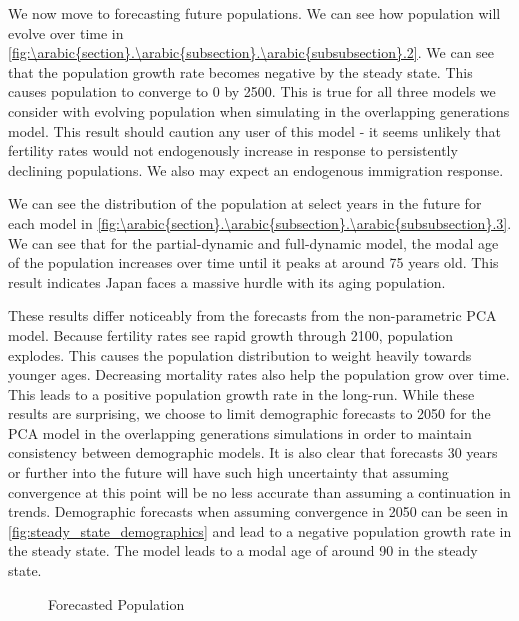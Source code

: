 \documentclass[10pt]{article}
\renewcommand{\thesection}{\arabic{section}}
\renewcommand{\thesubsection}{\thesection.\arabic{subsection}}
\renewcommand{\thesubsubsection}{\thesubsection.\arabic{subsubsection}}
\renewcommand{\subsubsection}[2][]{\oldsubsubsection[#1]{#2}\index{#1}\label{sec:\thesubsubsection}}
\numberwithin{equation}{subsection}
\newcommand*{\FigureDir}{../../graphs}
\begin{document}
\subsubsection{Population Forecasts}

\par We now move to forecasting future populations. We can see how population will evolve over time in \autoref{fig:\thesubsubsection.2}. We can see that the population growth rate becomes negative by the steady state. This causes population to converge to 0 by 2500. This is true for all three models we consider with evolving population when simulating in the overlapping generations model. This result should caution any user of this model - it seems unlikely that fertility rates would not endogenously increase in response to persistently declining populations. We also may expect an endogenous immigration response.

\par We can see the distribution of the population at select years in the future for each model in \autoref{fig:\thesubsubsection.3}. We can see that for the partial-dynamic and full-dynamic model, the modal age of the population increases over time until it peaks at around 75 years old. This result indicates Japan faces a massive hurdle with its aging population.

\par These results differ noticeably from the forecasts from the non-parametric PCA model. Because fertility rates see rapid growth through 2100, population explodes. This causes the population distribution to weight heavily towards younger ages. Decreasing mortality rates also help the population grow over time. This leads to a positive population growth rate in the long-run. While these results are surprising, we choose to limit demographic forecasts to 2050 for the PCA model in the overlapping generations simulations in order to maintain consistency between demographic models. It is also clear that forecasts 30 years or further into the future will have such high uncertainty that assuming convergence at this point will be no less accurate than assuming a continuation in trends. Demographic forecasts when assuming convergence in 2050 can be seen in \autoref{fig:steady_state_demographics} and lead to a negative population growth rate in the steady state. The model leads to a modal age of around 90 in the steady state.

\begin{figure}[!ht]
   \centering
   \caption{\label{fig:\thesubsubsection.2}Forecasted Population}
\end{figure}
\end{document}
